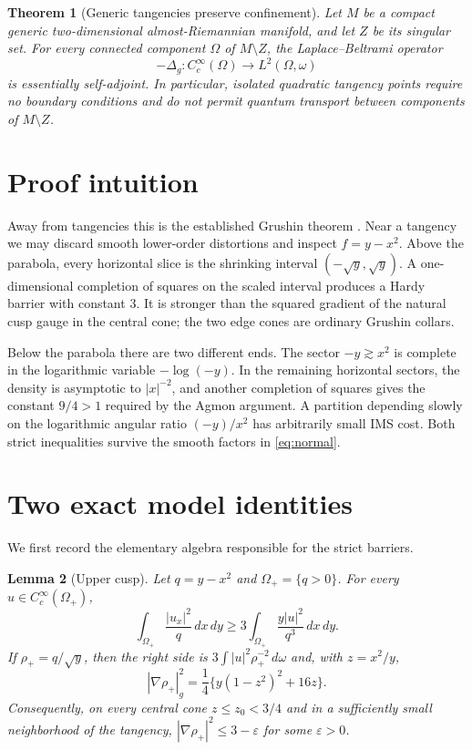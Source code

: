 \documentclass[11pt]{article}
\newtheorem{theorem}{Theorem}
\newtheorem{lemma}[theorem]{Lemma}
\begin{document}
\begin{theorem}[Generic tangencies preserve confinement]\label{thm:main}
Let $M$ be a compact generic two-dimensional almost-Riemannian manifold,
and let $Z$ be its singular set.  For every connected component
$\Omega$ of $M\setminus Z$, the Laplace--Beltrami operator
\[
 -\Delta_g:C_c^\infty(\Omega)\longrightarrow L^2(\Omega,\omega)
\]
is essentially self-adjoint.  In particular, isolated quadratic tangency
points require no boundary conditions and do not permit quantum transport
between components of $M\setminus Z$.
\end{theorem}

\section{Proof intuition}

Away from tangencies this is the established Grushin theorem
\cite{BL,FPR}.  Near a tangency we may discard smooth lower-order
distortions and inspect $f=y-x^2$.  Above the parabola, every horizontal
slice is the shrinking interval $(-\sqrt y,\sqrt y)$.  A one-dimensional
completion of squares on the scaled interval produces a Hardy barrier with
constant $3$.  It is stronger than the squared gradient of the natural cusp
gauge in the central cone; the two edge cones are ordinary Grushin collars.

Below the parabola there are two different ends.  The sector $-y\gtrsim
x^2$ is complete in the logarithmic variable $-\log(-y)$.  In the remaining
horizontal sectors, the density is asymptotic to $|x|^{-2}$, and another
completion of squares gives the constant $9/4>1$ required by the Agmon
argument.  A partition depending slowly on the logarithmic angular ratio
$(-y)/x^2$ has arbitrarily small IMS cost.  Both strict inequalities survive
the smooth factors in \eqref{eq:normal}.

\section{Two exact model identities}

We first record the elementary algebra responsible for the strict barriers.

\begin{lemma}[Upper cusp]\label{lem:upper}
Let $q=y-x^2$ and $\Omega_+=\{q>0\}$.  For every
$u\in C_c^\infty(\Omega_+)$,
\begin{equation}\label{eq:upperhardy}
 \int_{\Omega_+}\frac{|u_x|^2}{q}\,dx\,dy
 \ge 3\int_{\Omega_+}\frac{y|u|^2}{q^3}\,dx\,dy.
\end{equation}
If $\rho_+=q/\sqrt y$, then the right side is
$3\int |u|^2\rho_+^{-2}\,d\omega$ and, with $z=x^2/y$,
\begin{equation}\label{eq:uppergrad}
 |\nabla\rho_+|_g^2
 =\frac14\{y(1-z^2)^2+16z\}.
\end{equation}
Consequently, on every central cone $z\le z_0<3/4$ and in a sufficiently
small neighborhood of the tangency,
$|\nabla\rho_+|^2\le3-\varepsilon$ for some $\varepsilon>0$.
\end{lemma}
\end{document}
